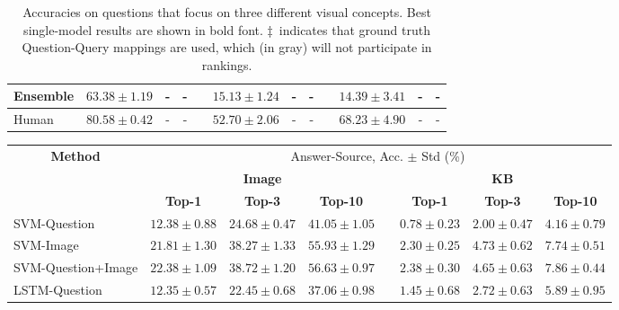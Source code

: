 \documentclass[10pt,journal]{IEEEtran}
\begin{document}
\begin{table*}[t!]
{\begin{tabular}{lccclccccccc}
		\hline\hline
		{Ensemble} & {$63.38\pm1.19$} &{-} &{-} & &{$15.13\pm1.24$} &{-} &{-} & & {$14.39\pm3.41$} &{-} &{-}	\\
		\hline\hline
Human & $80.58\pm0.42$
      &- &- & & $52.70\pm2.06$
      &- &- & & $68.23\pm4.90$
      &-&- \\ \hline
\end{tabular}}
	\caption{Accuracies on questions that focus on three different visual concepts.  Best single-model results are shown in bold font. $\ddagger$~indicates that ground truth Question-Query mappings are used, which (in \colorbox[rgb]{0.8,0.8,0.8}{gray}) will not participate in rankings.}
	\label{question_cat}
\end{table*}



\begin{table*}[t!]
	\centering
	\resizebox{0.98\linewidth}{!}
        {
	\begin{tabular}{lccclccc}
		\hline
		\multicolumn{1}{c}{\multirow{3}{*}{\textbf{Method}}} & \multicolumn{7}{c}{Answer-Source, Acc. $\pm$ Std (\%)}                                                                                              \\ \cline{2-8}
		\multicolumn{1}{c}{}                                 & \multicolumn{3}{c}{\textbf{Image}}                & \multicolumn{1}{c}{} & \multicolumn{3}{c}{\textbf{KB}}                   \\ \cline{2-4} \cline{6-8}
		\multicolumn{1}{c}{}                                 & \textbf{Top-1} & \textbf{Top-3} & \textbf{Top-10} & \textbf{}            & \textbf{Top-1} & \textbf{Top-3} & \textbf{Top-10} \\ \hline
		SVM-Question                                         & $12.38\pm0.88$          & $24.68\pm0.47$          & $41.05\pm1.05$           &                      & $0.78\pm0.23$           & $2.00\pm0.47$           & $4.16\pm0.79$            \\
		SVM-Image                                            & $21.81\pm1.30$          & $38.27\pm1.33$          & $55.93\pm1.29$           &                      & $2.30\pm0.25$           & $4.73\pm0.62$           & $7.74\pm0.51$            \\
		SVM-Question+Image                                   & $22.38\pm1.09$          & $38.72\pm1.20$          & $56.63\pm0.97$           &                      & $2.38\pm0.30$           & $4.65\pm0.63$           & $7.86\pm0.44$            \\
		LSTM-Question                                        & $12.35\pm0.57$          & $22.45\pm0.68$          & $37.06\pm0.98$           &                      & $1.45\pm0.68$           & $2.72\pm0.63$           & $5.89\pm0.95$           \\

\end{tabular}}
\end{table*}
\end{document}
